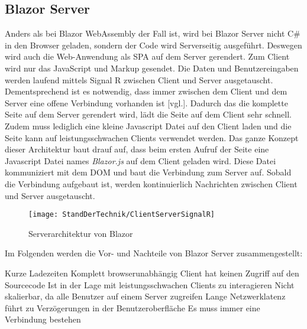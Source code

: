 \subsection{Blazor Server}
Anders als bei Blazor WebAssembly der Fall ist, wird bei Blazor Server nicht C\# in den
Browser geladen, sondern der Code wird Serverseitig ausgeführt. Deswegen wird auch die
Web-Anwendung als SPA auf dem Server gerendert. Zum Client wird nur das JavaScript und Markup
gesendet. Die Daten und Benutzereingaben werden laufend mittels Signal R zwischen Client und Server
ausgetauscht. Dementsprechend ist es notwendig, dass immer zwischen dem Client und dem Server
eine offene Verbindung vorhanden ist \cite{HierKommtBlazor}[vgl.].
\newline
\newline
Dadurch das die komplette Seite auf dem Server gerendert wird, lädt die Seite auf dem Client sehr
schnell. Zudem muss lediglich eine kleine Javascript Datei auf den Client laden und die Seite
kann auf leistungsschwachen Clients verwendet werden.
\newline
\newline
Das ganze Konzept dieser Architektur baut drauf auf, dass beim ersten Aufruf der Seite eine
Javascript Datei names \emph{Blazor.js} auf dem Client geladen wird. Diese Datei kommuniziert
mit dem DOM und baut die Verbindung zum Server auf. Sobald die Verbindung aufgebaut ist, werden
kontinuierlich Nachrichten zwischen Client und Server ausgetauscht.

\begin{figure}[h]
    \centering
    \texttt{[image: StandDerTechnik/ClientServerSignalR]}
    \caption[Serverarchitektur von Blazor]{Serverarchitektur von Blazor}
    \label{img:clientserversignalR}
\end{figure}

Im Folgenden werden die Vor- und Nachteile von Blazor Server zusammengestellt:
\begin{itemize}
    \pro Kurze Ladezeiten
    \pro Komplett browserunabhängig
    \pro Client hat keinen Zugriff auf den Sourcecode
    \pro Ist in der Lage mit leistungsschwachen Clients zu interagieren
    \con Nicht skalierbar, da alle Benutzer auf einem Server zugreifen
    \con Lange Netzwerklatenz führt zu Verzögerungen in der Benutzeroberfläche
    \con Es muss immer eine Verbindung bestehen
\end{itemize}